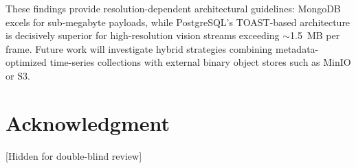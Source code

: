 \documentclass[conference]{IEEEtran}
\begin{document}
These findings provide resolution-dependent architectural guidelines: MongoDB excels for sub-megabyte payloads, while PostgreSQL's TOAST-based architecture is decisively superior for high-resolution vision streams exceeding $\sim$1.5~MB per frame. Future work will investigate hybrid strategies combining metadata-optimized time-series collections with external binary object stores such as MinIO or S3.


\section*{Acknowledgment}
[Hidden for double-blind review]




\end{document}
